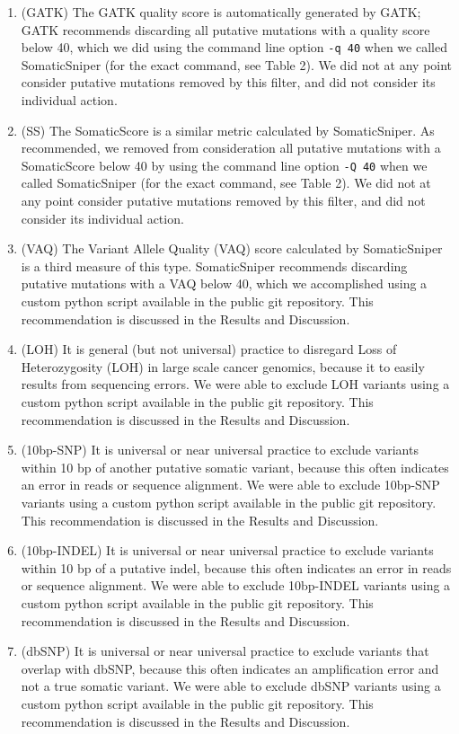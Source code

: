 \documentclass[11pt]{article} %
\begin{document}
\begin{enumerate}
\item (GATK) The GATK quality score is automatically generated by GATK; GATK recommends discarding all putative mutations with a quality score below 40, which we did using the command line option \texttt{-q 40} when we called SomaticSniper (for the exact command, see Table 2). We did not at any point consider putative mutations removed by this filter, and did not consider its individual action. 
\item (SS) The SomaticScore is a similar metric calculated by SomaticSniper. As recommended, we removed from consideration all putative mutations with a SomaticScore below 40 by using the command line option \texttt{-Q 40} when we called SomaticSniper (for the exact command, see Table 2). We did not at any point consider putative mutations removed by this filter, and did not consider its individual action. 
\item (VAQ) The Variant Allele Quality (VAQ) score calculated by SomaticSniper is a third measure of this type. SomaticSniper recommends discarding putative mutations with a VAQ below 40, which we accomplished using a custom python script available in the public git repository. This recommendation is discussed in the Results and Discussion.
\item (LOH) It is general (but not universal) practice to disregard Loss of Heterozygosity (LOH) in large scale cancer genomics, because it to easily results from sequencing errors. We were able to exclude LOH variants using a custom python script available in the public git repository. This recommendation is discussed in the Results and Discussion.
\item (10bp-SNP) It is universal or near universal practice to exclude variants within 10 bp of another putative somatic variant, because this often indicates an error in reads or sequence alignment. We were able to exclude 10bp-SNP variants using a custom python script available in the public git repository. This recommendation is discussed in the Results and Discussion.
\item (10bp-INDEL) It is universal or near universal practice to exclude variants within 10 bp of a putative indel, because this often indicates an error in reads or sequence alignment. We were able to exclude 10bp-INDEL variants using a custom python script available in the public git repository. This recommendation is discussed in the Results and Discussion.
\item (dbSNP) It is universal or near universal practice to exclude variants that overlap with dbSNP, because this often indicates an amplification error and not a true somatic variant. We were able to exclude dbSNP variants using a custom python script available in the public git repository. This recommendation is discussed in the Results and Discussion.

\end{enumerate}
\end{document}
